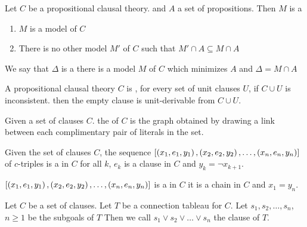 \begin{defi}
Let $C$ be a propositional clausal theory. and $A$ a set of propositions. Then $M$ is a  \iffTx{}
\begin{enumerate}
 \item $M$ is a model of $C$
 \item There is no other model $M'$ of $C$ such that $M'\cap A\subseteq M\cap A$
\end{enumerate}
We say that $\Delta$ is a  \iffTx{} there is a model $M$ of $C$ which minimizes $A$ and $\Delta=M\cap A$
\cite{conf/ijcai/Eshghi93}
\end{defi}

\begin{defi}
A propositional clausal theory $C$ is  \iffTx{}, for every set of unit clauses $U$, if $C\cup U$ is inconsistent. then the empty clause is unit-derivable from $C\cup U$.
\cite{conf/ijcai/Eshghi93}
\end{defi}

\begin{defi}
Given a set of clauses $C$. the  of $C$ is the graph obtained by drawing a link between each complimentary pair of literals in the set.
\cite{conf/ijcai/Eshghi93}
\end{defi}

\begin{defi}[Chain]
Given the set of clauses $C$, the sequence $\left[ \left( x_1,e_1,y_1\right),\left( x_2,e_2,y_2\right),\ldots,\left( x_n,e_n,y_n\right)\right]$ of $c$-triples is a  in $C$ \iffTx{} for all $k$, $e_k$ is a clause in $C$ and $y_k=\neg x_{k+1}$.
\cite{conf/ijcai/Eshghi93}
\end{defi}

\begin{defi}
$\left[ \left( x_1,e_1,y_1\right),\left( x_2,e_2,y_2\right),\ldots,\left( x_n,e_n,y_n\right)\right]$ is a  in $C$ \iffTx{} it is a chain in $C$ and $x_1=y_n$.
\cite{conf/ijcai/Eshghi93}
\end{defi}

\begin{defi}
Let $C$ be a set of clauses. Let $T$ be a connection tableau for $C$. Let $s_1,s_2,\ldots,s_n$, $n\geq 1$ be the subgoals of $T$ Then we call $s_1\vee s_2\vee\ldots\vee s_n$ the  clause of $T$.
\cite{conf/ijcai/Fuchs99}
\end{defi}

